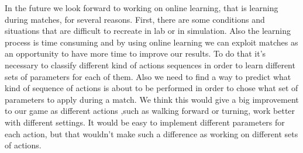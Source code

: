 \documentclass[a4paper, twocolumn]{article}
\begin{document}
In the future we look forward to working on online learning, that is learning during matches, for several reasons. First, there are some conditions and situations that are difficult to recreate in lab or in simulation. Also the learning process is time consuming and by using online learning we can exploit matches as an opportunity to have more time to improve our results. To do that it's necessary to classify different kind of actions sequences in order to learn different sets of parameters for each of them. Also we need to find a way to predict what kind of sequence of actions is about to be performed in order to chose what set of parameters to apply during a match. We think this would give a big improvement to our game as different actions ,such as walking forward or turning, work better with different settings. It would be easy to implement different parameters for each action, but that wouldn't make such a difference as working on different sets of actions. 



\end{document}
